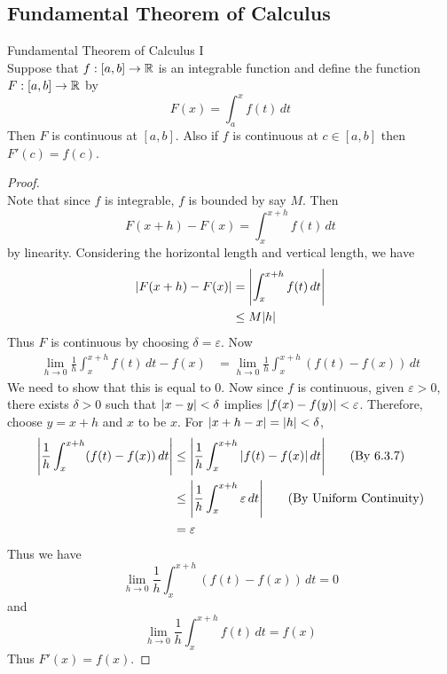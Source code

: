 \documentclass[a4paper]{article}
\begin{document}
\subsection{Fundamental Theorem of Calculus}
\begin{thm}{Fundamental Theorem of Calculus I}{}\\ Suppose that $f:[a,b]\to\mathbb{R}$ is an integrable function and define the function $F:[a,b]\to\mathbb{R}$ by $$F(x)=\int_{a}^{x}f(t)\,dt$$ Then $F$ is continuous at $[a,b]$. Also if $f$ is continuous at $c\in[a,b]$ then $F'(c)=f(c)$. 
\begin{proof}\\
Note that since $f$ is integrable, $f$ is bounded by say $M$. Then $$F(x+h)-F(x)=\int_x^{x+h}f(t)\,dt$$ by linearity. Considering the horizontal length and vertical length, we have
\begin{align*}
\abs{F(x+h)-F(x)}&=\abs{\int_x^{x+h}f(t)\,dt}\\
&\leq M\abs{h}
\end{align*}
Thus $F$ is continuous by choosing $\delta=\varepsilon$. 
Now 
\begin{align*}
\lim_{h\to 0}\frac{1}{h}\int_x^{x+h}f(t)\,dt-f(x)&=\lim_{h\to 0}\frac{1}{h}\int_x^{x+h}(f(t)-f(x))\,dt
\end{align*}
We need to show that this is equal to $0$. Now since $f$ is continuous, given $\varepsilon>0$, there exists $\delta>0$ such that $\abs{x-y}<\delta$ implies $\abs{f(x)-f(y)}<\varepsilon$. Therefore, choose $y=x+h$ and $x$ to be $x$. For $\abs{x+h-x}=\abs{h}<\delta$, 
\begin{align*}
\abs{\frac{1}{h}\int_x^{x+h}(f(t)-f(x))\,dt}&\leq\abs{\frac{1}{h}\int_x^{x+h}\abs{f(t)-f(x)}\,dt}\tag{By 6.3.7}\\
&\leq\abs{\frac{1}{h}\int_x^{x+h}\varepsilon\,dt}\tag{By Uniform Continuity}\\
&=\varepsilon
\end{align*}
Thus we have $$\lim_{h\to 0}\frac{1}{h}\int_x^{x+h}(f(t)-f(x))\,dt=0$$ and $$\lim_{h\to 0}\frac{1}{h}\int_x^{x+h}f(t)\,dt=f(x)$$
Thus $F'(x)=f(x)$. 
\end{proof}
\end{thm}
\end{document}
